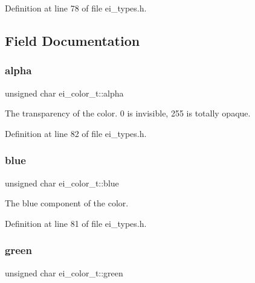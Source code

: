 Definition at line 78 of file ei\+\_\+types.\+h.



\subsection{Field Documentation}
\mbox{\label{structei__color__t_af213a14356db920b1a04f5270263ae61}} 
\subsubsection{\texorpdfstring{alpha}{alpha}}
{\footnotesize\ttfamily unsigned char ei\+\_\+color\+\_\+t\+::alpha}



The transparency of the color. 0 is invisible, 255 is totally opaque. 



Definition at line 82 of file ei\+\_\+types.\+h.

\mbox{\label{structei__color__t_af8d67b7a72cbb586519b55033350fb8c}} 
\subsubsection{\texorpdfstring{blue}{blue}}
{\footnotesize\ttfamily unsigned char ei\+\_\+color\+\_\+t\+::blue}



The blue component of the color. 



Definition at line 81 of file ei\+\_\+types.\+h.

\mbox{\label{structei__color__t_ad85ce262fb9c76fe3c52b4eed19505d1}} 
\subsubsection{\texorpdfstring{green}{green}}
{\footnotesize\ttfamily unsigned char ei\+\_\+color\+\_\+t\+::green}



